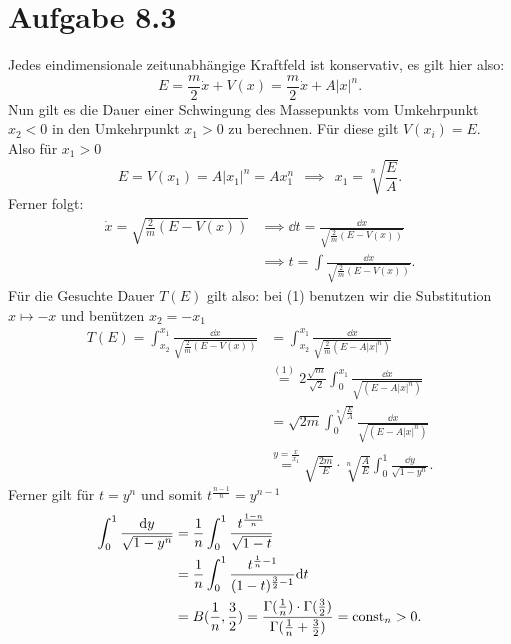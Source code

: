 \documentclass{theozettel}
\begin{document}
\section*{Aufgabe 8.3}
Jedes eindimensionale zeitunabhängige Kraftfeld ist konservativ, es gilt hier also:
	\[
		E = \frac{m}{2} \dot{x} + V(x) = \frac{m}{2}\dot{x} + A|x|^{n}.
	\]
Nun gilt es die Dauer einer Schwingung des Massepunkts vom Umkehrpunkt $x_{2} < 0$ in den Umkehrpunkt $x_{1} > 0$ zu berechnen. Für diese gilt $V(x_{i}) = E$. Also für $x_{1} > 0$
	\[
		E = V(x_{1}) = A|x_{1}|^{n} = Ax_{1}^{n} \ \ \implies \ \ x_{1} = \sqrt[n]{\frac{E}{A}}.
	\]
Ferner folgt:
	\begin{align*}
		\dot{x} = \sqrt{\frac{2}{m}(E-V(x)) } & \implies \dd t = \frac{\dd x}{\sqrt{\frac{2}{m}(E-V(x)) }} \\
		&\implies t = \int \frac{\dd x}{\sqrt{\frac{2}{m}(E-V(x)) }}.
	\end{align*}
Für die Gesuchte Dauer $T(E)$ gilt also: bei (1) benutzen wir die Substitution $x \mapsto -x$ und benützen $x_{2} = - x_{1}$
	\begin{align*}
		T(E) = \int_{x_{2}}^{x_{1}} \frac{\dd x}{\sqrt{\frac{2}{m}(E-V(x)) }}  &= \int_{x_{2}}^{x_{1}} \frac{\dd x}{\sqrt{\frac{2}{m}(E-A|x|^{n}) }} \\
		&\stackrel{(1)}{=} 2\frac{\sqrt{m}}{\sqrt{2}} \int_{0}^{x_{1}} \frac{\dd x}{\sqrt{(E-A|x|^{n}) }} \\
		&=\sqrt{2m} \int_{0}^{\sqrt[n]{\frac{E}{A}}} \frac{\dd x}{\sqrt{(E-A|x|^{n}) }} \\
		&\stackrel{y = \frac{x}{x_{1}}}{=} \sqrt{\frac{2m}{E} } \cdot \sqrt[n]{\frac{A}{E}}  \int_{0}^{1} \frac{\dd y}{\sqrt{1 - y^{n}}}.
	\end{align*}
Ferner gilt für $t = y^{n}$ und somit $t^{\frac{n-1}{n}} = y^{n-1}$
	\begin{align*}
		\int_{0}^{1} \frac{\dd y}{\sqrt{1-y^{n}}} &= \frac{1}{n} \int_{0}^{1} \frac{t^{\frac{1-n}{n}}}{\sqrt{1-t}} \\
		&= \frac{1}{n} \int_{0}^{1} \frac{t^{\frac{1}{n} -1 }}{(1-t)^{\frac{3}{2}-1}} \dd t \\
		&= B(\frac{1}{n},\frac{3}{2}) = \frac{\Gamma(\frac{1}{n}) \cdot \Gamma(\frac{3}{2})}{\Gamma(\frac{1}{n} + \frac{3}{2})} = \operatorname{const}_{n} > 0.
	\end{align*}
\end{document}
